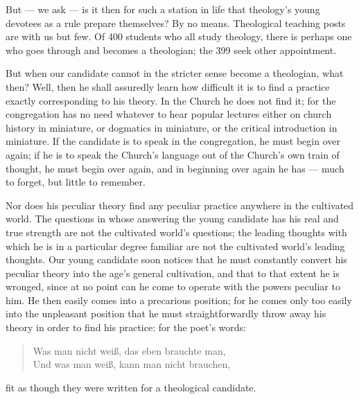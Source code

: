 \documentclass[12pt,a4paper]{book}
\begin{document}
But --- we ask --- is it then for such a station in life that theology's young devotees as a rule
prepare themselves? By no means. Theological teaching posts are with us but few. Of 400 students
who all study theology, there is perhaps one who goes through and becomes a theologian; the 399
seek other appointment.

But when our candidate cannot in the stricter sense become a theologian, what then? Well, then he
shall assuredly learn how difficult it is to find a practice exactly corresponding to his theory. In
the Church he does not find it; for the congregation has no need whatever to hear popular lectures
either on church history in miniature, or dogmatics in miniature, or the critical introduction in
miniature. If the candidate is to speak in the congregation, he must begin over again; if he is to
speak the Church's language out of the Church's own train of thought, he must begin over again, and
in beginning over again he has --- much to forget, but little to remember.

Nor does his peculiar theory find any peculiar practice anywhere in the cultivated world. The
questions in whose answering the young candidate has his real and true strength are not the
cultivated world's questions; the leading thoughts with which he is in a particular degree familiar
are not the cultivated world's leading thoughts. Our young candidate soon notices that he must
constantly convert his peculiar theory into the age's general cultivation,
and that to that extent he is wronged, since at no point can he come to operate with the powers
peculiar to him. He then easily comes into a precarious position; for he comes only too easily into
the unpleasant position that he
must straightforwardly throw away his theory in order to find his practice: for the poet's words:

\begin{quote}
Was man nicht weiß, das eben brauchte man,\\
Und was man weiß, kann man nicht brauchen,
\end{quote}

fit as though they were written for a theological candidate.
\end{document}
